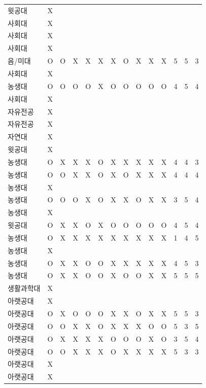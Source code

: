 \documentclass[11pt,a4paper]{article}
\begin{document}
\begin{center}
\begin{tabular}{ | p{2cm} | c | c | c | c | c | c | c | c | c | c | c | c | c | }
윗공대 & X & & & & & & & & & & & & \\
사회대 & X & & & & & & & & & & & & \\
사회대 & X & & & & & & & & & & & & \\
사회대 & X & & & & & & & & & & & & \\
음/미대 & O & O & X & X & X & X & O & X & X & X & 5 & 5 & 3 \\
사회대 & X & & & & & & & & & & & & \\
농생대 & O & O & O & O & X & O & O & O & O & O & 4 & 5 & 4 \\
사회대 & X & & & & & & & & & & & & \\
자유전공 & X & & & & & & & & & & & & \\
자유전공 & X & & & & & & & & & & & & \\
자연대 & X & & & & & & & & & & & & \\
윗공대 & X & & & & & & & & & & & & \\
농생대 & O & X & X & X & O & X & X & X & X & X & 4 & 4 & 3 \\
농생대 & O & O & X & X & O & X & O & X & X & X & 4 & 4 & 4 \\
농생대 & X & & & & & & & & & & & & \\
농생대 & O & O & O & X & O & X & X & O & X & X & 3 & 5 & 4 \\
농생대 & X & & & & & & & & & & & & \\
윗공대 & O & X & X & O & X & O & O & O & O & O & 4 & 5 & 4 \\
농생대 & O & X & X & X & X & X & X & X & X & X & 1 & 4 & 5 \\
농생대 & X & & & & & & & & & & & & \\
농생대 & O & X & X & O & O & X & X & X & X & X & 4 & 5 & 3 \\
농생대 & O & X & X & O & O & X & O & O & X & X & 5 & 5 & 5 \\
생활과학대 & X & & & & & & & & & & & & \\
아랫공대 & X & & & & & & & & & & & & \\
아랫공대 & O & X & O & O & O & X & X & O & X & X & 5 & 5 & 3 \\
아랫공대 & O & O & X & X & O & X & X & X & O & O & 5 & 3 & 5 \\
아랫공대 & O & X & X & X & X & O & O & O & X & O & 3 & 5 & 4 \\
아랫공대 & O & O & X & X & X & O & X & X & X & X & 5 & 3 & 3 \\
아랫공대 & X & & & & & & & & & & & & \\
아랫공대 & X & & & & & & & & & & & & \\

\end{tabular}
\end{center}
\end{document}
